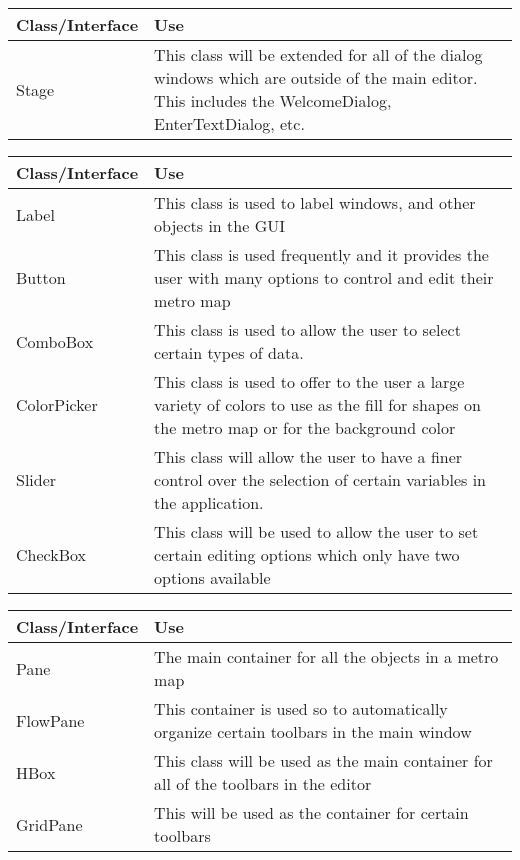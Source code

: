 \documentclass[10pt,a4paper]{article}
\begin{document}
\begin{center}
\begin{tabular}{| l | p{12cm} |}
\hline
Class/Interface & Use \\ \hline
Stage & This class will be extended for all of the dialog windows which are outside of the main editor. This includes the WelcomeDialog, EnterTextDialog, etc. \\ \hline
\end{tabular}
\end{center}

\begin{center}
\begin{tabular}{| l | p{12cm} |}
\hline
Class/Interface & Use \\ \hline
Label & This class is used to label windows, and other objects in the GUI \\ \hline
Button & This class is used frequently and it provides the user with many options to control and edit their metro map \\ \hline
ComboBox & This class is used to allow the user to select certain types of data. \\ \hline
ColorPicker & This class is used to offer to the user a large variety of colors to use as the fill for shapes on the metro map or for the background color \\ \hline
Slider & This class will allow the user to have a finer control over the selection of certain variables in the application. \\ \hline
CheckBox & This class will be used to allow the user to set certain editing options which only have two options available \\ \hline
\end{tabular}
\end{center}

\begin{center}
\begin{tabular}{| l | p{12cm} |}
\hline
Class/Interface & Use \\ \hline
Pane & The main container for all the objects in a metro map \\ \hline
FlowPane & This container is used so to automatically organize certain toolbars in the main window \\ \hline
HBox & This class will be used as the main container for all of the toolbars in the editor \\ \hline
GridPane & This will be used as the container for certain toolbars \\ \hline
\end{tabular}
\end{center}
\end{document}
